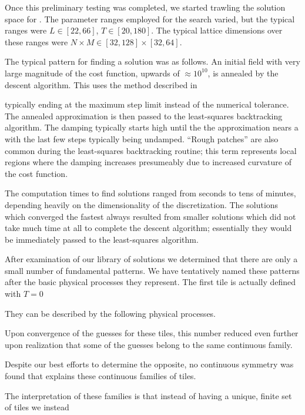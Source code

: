\begin{description}
{Once this preliminary testing was completed, we started trawling the solution space
for \twots. The parameter ranges employed for the search varied, but the typical ranges were
$L \in [22, 66]$, $T \in [20, 180]$. The typical lattice dimensions over these ranges
were $N\times M \in [32, 128] \times [32, 64]$.

The typical pattern for finding a solution was as follows. An initial field with very
large magnitude of the cost function, upwards of $\approx 10^{10}$, is annealed by the descent
algorithm.
This uses the method described in %


 typically ending at the maximum step limit instead of the numerical
tolerance. The annealed approximation is then passed
to the least-squares backtracking algorithm. The damping
typically starts high until the the approximation nears a \twot with
the last few steps typically being undamped.
``Rough patches'' are also common during the least-squares
backtracking routine; this term represents local regions where the damping increases
presumeably due to increased curvature of the cost function.

The computation times to find solutions ranged from seconds to tens of minutes, depending
heavily on the dimensionality of the discretization. The solutions which converged the fastest always resulted
from smaller solutions which did not take much time at all to complete the descent algorithm;
essentially they would be immediately passed to the least-squares algorithm.





After examination of our library of solutions we determined that there are
only a small number of fundamental patterns. We have tentatively named
these patterns after the basic physical processes they represent.
The first tile is actually defined with $T=0$

They can be described by the
following physical processes.


Upon convergence of the
guesses for these tiles, this number reduced even further upon realization
that some of the guesses belong to the same continuous family.

Despite our best efforts to determine the opposite, no continuous symmetry
was found that explains these continuous families of tiles.

The interpretation of these families is that instead of having a unique, finite set of tiles
we instead

}
\end{description}
